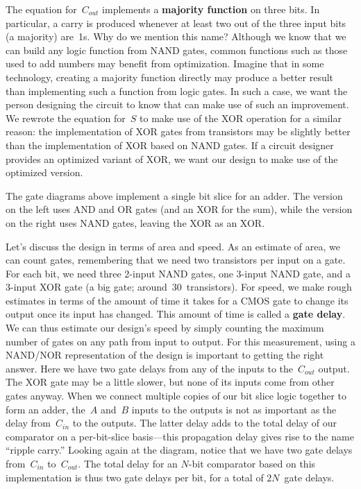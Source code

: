 The equation for~$C_{out}$ implements a {\bf majority function}
on three bits.  In particular, a carry is produced whenever at least two 
out of the three input bits (a majority) are~1s.  Why do we mention
this name?  Although we know that we can build any logic function from
NAND gates, common functions such as those used to add numbers may
benefit from optimization.  Imagine that in some technology, creating
a majority function directly may produce a better result than implementing
such a function from logic gates.  In such a case, we want the 
person designing the circuit to know that can make use of such an 
improvement.
%
We rewrote the equation for~$S$ to make use of the XOR operation for 
a similar reason: the implementation of XOR gates from transistors
may be slightly better than the implementation of XOR based on NAND gates.
If a circuit designer provides an optimized variant of XOR, we want
our design to make use of the optimized version.

\centerline{\hspace{0.5in}%
}\vspace{12pt}

The gate diagrams above implement a single bit slice for an adder.
The version on
the left uses AND and OR gates (and an XOR for the sum), while the
version on the right uses NAND gates, leaving the XOR as an XOR.

Let's discuss the design in terms of area and speed.
As an estimate of area, we can count gates, remembering that we need
two transistors per input on a gate.
For each bit, we need three \mbox{2-input} NAND gates, one \mbox{3-input}
NAND gate, and a \mbox{3-input} XOR gate (a big gate; around~30~transistors).
%
For speed, we make rough estimates in terms of the amount of time
it takes for a CMOS gate to change its output once its input has changed.
This amount of time is called a {\bf gate delay}.  
%
We can thus estimate our design's
speed by simply counting the maximum number of gates on any path
from input to output.  For this measurement, using a NAND/NOR 
representation of the design is important to getting the right answer.
Here we have two gate delays from any of the inputs
to the~$C_{out}$ output.  The XOR gate may be a little slower, but
none of its inputs come from other gates anyway.
%
When we connect multiple copies of our bit slice logic together to 
form an adder, the~$A$ and~$B$ inputs
to the outputs is not as important as the delay from~$C_{in}$
to the outputs.  The latter delay adds to the total delay of
our comparator on a per-bit-slice basis---this propagation delay
gives rise to the name ``ripple carry.''
Looking again at the diagram, 
notice that we have two gate delays from~$C_{in}$
to~$C_{out}$.
The total delay for an \mbox{$N$-bit} comparator based on this
implementation is thus two gate delays per bit, 
for a total of $2N$~gate delays.\\


